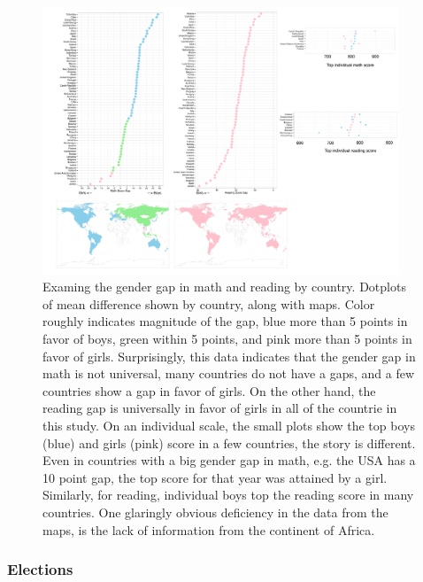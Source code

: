 \documentclass{article}
\begin{document}
\begin{figure}[tp]
\centerline{\includegraphics[width=0.95\textwidth]{images/PISA.pdf}}
\caption{Examing the gender gap in math and reading by country. Dotplots of mean difference shown by country, along with maps. Color roughly indicates magnitude of the gap, blue more than 5 points in favor of boys, green within 5 points, and pink more than 5 points in favor of girls. Surprisingly, this data indicates that the gender gap in math is not universal, many countries do not have a gaps, and a few countries show a gap in favor of girls. On the other hand, the reading gap is universally in favor of girls in all of the countrie in this study. On an individual scale, the small plots show the top boys (blue) and girls (pink) score in a few countries, the story is different. Even in countries with a big gender gap in math, e.g. the USA has a 10 point gap, the top score for that year was attained by a girl. Similarly, for reading, individual boys top the reading score in many countries. One glaringly obvious deficiency in the data from the maps, is the lack of information from the continent of Africa.}
\label{OECD-gender}
\end{figure}


\subsubsection{Elections}
\end{document}
